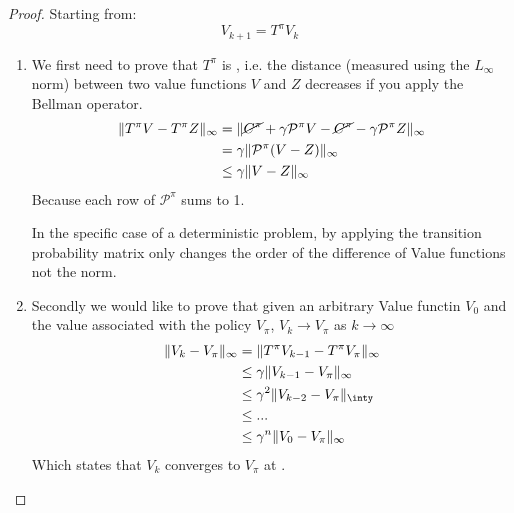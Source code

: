 \begin{proof}
Starting from:
\[V_{k+1} = T^{\pi}V_k\]
\begin{enumerate}
\item We first need to prove that $T^\pi$ is ,  i.e. the distance (measured using the $L_{\infty}$ norm) between two value functions $V$ and $Z$ decreases if you apply the Bellman operator.
\begin{align*}
\lVert T^{\pi}V - T^{\pi}Z\rVert_{\infty} &= \lVert\cancel{C^{\pi}}+\gamma \mathcal{P}^{\pi}V - \cancel{C^{\pi}} - \gamma \mathcal{P}^{\pi}Z\rVert_{\infty}\\
&= \gamma \lVert\mathcal{P}^{\pi}(V-Z)\rVert_{\infty}\\
&\le \gamma \lVert V-Z\rVert_{\infty}
\end{align*}
Because each row of $\mathcal{P}^{\pi}$ sums to 1.

In the specific case of a deterministic problem, by applying the transition probability matrix only changes the order of the difference of Value functions not the norm.

\item Secondly we would like to prove that given an arbitrary Value functin $V_0$ and the value associated with the policy $V_{\pi}$, $V_{k}\to V_{\pi}$ as $k\to\infty$
\begin{align*}
\norma{V_k - V_{\pi}}_{\infty} &= \norma{T^{\pi}V_{k-1} - T^{\pi}V_{\pi}}_{\infty} \\
&\le\gamma\norma{V_{k-1} - V_{\pi}}_{\infty} \\
&\le \gamma^2 \norma{V_{k-2} - V_{\pi}}_{\inty}\\
&\le ...\\
&\le \gamma^n \norma{V_{0}-V_{\pi}}_{\infty}
\end{align*}
Which states that $V_{k}$ converges to $V_{\pi}$ at .
\end{enumerate}
\end{proof}


















